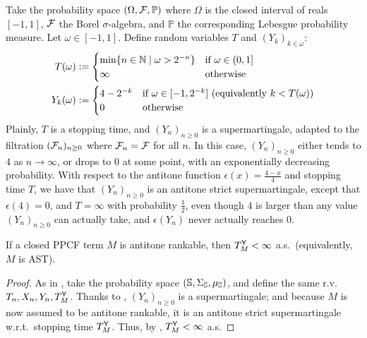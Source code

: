 \begin{example}
Take the probability space $(\Omega, \mathcal{F}, \mathbb{P})$ where $\Omega$ is the closed interval of reals $[-1, 1]$, $\mathcal{F}$ the Borel $\sigma$-algebra, and $\mathbb{P}$ the corresponding Lebesgue probability measure.
Let $\omega \in [-1, 1]$. Define random variables $T$ and $(Y_k)_{k \in \omega}$:
\begin{align*}
T(\omega) & := 
\begin{cases}
\min\{n \in \mathbb{N} \mid \omega > 2^{-n}\} & \hbox{if $\omega \in (0, 1]$}\\
\infty & \hbox{otherwise}
\end{cases} 
\\
Y_k(\omega) & := 
\begin{cases}
4-2^{-k} & \hbox{if $\omega \in [-1, 2^{-k}]$ (equivalently $k < T(\omega)$)}\\
0 & \hbox{otherwise}
\end{cases} 
\end{align*}
Plainly, $T$ is a stopping time, and $(Y_n)_{n \geq 0}$ is a supermartingale, adapted to the filtration $(\mathcal{F}_n)_{n \geq 0}$ where $\mathcal{F}_n = \mathcal{F}$ for all $n$. 
In this case, $(Y_n)_{n \geq 0}$ either tends to $4$ as $n \to \infty$, or drops to 0 at some point, with an exponentially decreasing probability. 
With respect to the antitone function $\epsilon(x) = \frac{4-x}{4}$ and stopping time $T$, we have that $(Y_n)_{n \geq 0}$ is an antitone strict supermartingale, except that $\epsilon(4) = 0$, and $T = \infty$ with probability $\frac 1 2$, even though $4$ is larger than any value $(Y_n)_{n \geq 0}$ can actually take, and $\epsilon(Y_n)$ never actually reaches $0$.
\end{example}


\begin{theorem} \label{thm:antitone rankable implies termination}
If a closed PPCF term $M$ is antitone rankable, then $T_M^{\mathsf{Y}} < \infty$ a.s.~(equivalently, $M$ is AST).
\end{theorem}
\begin{proof}
As in %
,
take the probability space $({\mathbb{S}}, \Sigma_{\mathbb{S}}, \mu_{\mathbb{S}})$, and define the same r.v.~$T_n, X_n, Y_n, T_M^{\mathsf{Y}}$. 
Thanks to , $(Y_n)_{n \geq 0}$ is a supermartingale; and because $M$ is now assumed to be antitone rankable, it is an antitone strict supermartingale w.r.t.~stopping time $T_M^{\mathsf{Y}}$. 
Thus, by , $T_M^{\mathsf{Y}} < \infty$ a.s.
\end{proof}

